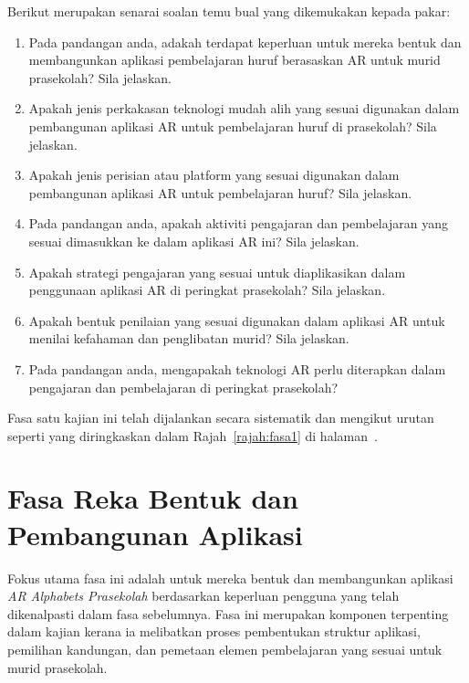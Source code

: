 \begin{itemize}
Berikut merupakan senarai soalan temu bual yang dikemukakan kepada pakar:

\begin{enumerate}
  \item Pada pandangan anda, adakah terdapat keperluan untuk mereka bentuk dan membangunkan aplikasi pembelajaran huruf berasaskan AR untuk murid prasekolah? Sila jelaskan.
  
  \item Apakah jenis perkakasan teknologi mudah alih yang sesuai digunakan dalam pembangunan aplikasi AR untuk pembelajaran huruf di prasekolah? Sila jelaskan.
  
  \item Apakah jenis perisian atau platform yang sesuai digunakan dalam pembangunan aplikasi AR untuk pembelajaran huruf? Sila jelaskan.
  
  \item Pada pandangan anda, apakah aktiviti pengajaran dan pembelajaran yang sesuai dimasukkan ke dalam aplikasi AR ini? Sila jelaskan.
  
  \item Apakah strategi pengajaran yang sesuai untuk diaplikasikan dalam penggunaan aplikasi AR di peringkat prasekolah? Sila jelaskan.
  
  \item Apakah bentuk penilaian yang sesuai digunakan dalam aplikasi AR untuk menilai kefahaman dan penglibatan murid? Sila jelaskan.
  
  \item Pada pandangan anda, mengapakah teknologi AR perlu diterapkan dalam pengajaran dan pembelajaran di peringkat prasekolah?
\end{enumerate}

Fasa satu kajian ini telah dijalankan secara sistematik dan mengikut urutan seperti yang diringkaskan dalam Rajah~\ref{rajah:fasa1} di halaman~\pageref{rajah:fasa1}.



\section{Fasa Reka Bentuk dan Pembangunan Aplikasi}

Fokus utama fasa ini adalah untuk mereka bentuk dan membangunkan aplikasi \textit{AR Alphabets Prasekolah} berdasarkan keperluan pengguna yang telah dikenalpasti dalam fasa sebelumnya. Fasa ini merupakan komponen terpenting dalam kajian kerana ia melibatkan proses pembentukan struktur aplikasi, pemilihan kandungan, dan pemetaan elemen pembelajaran yang sesuai untuk murid prasekolah.


\end{itemize}
